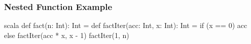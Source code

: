 \documentclass[dvipsnames]{beamer}
\theoremstyle{plain}
\begin{document}
\begin{frame}[fragile]
  \frametitle{Nested Function Example}

  \begin{example}
    \begin{pygments}{scala}
def fact(n: Int): Int = {
    def factIter(acc: Int, x: Int): Int =
        if (x == 0) acc
        else factIter(acc * x, x - 1)
    factIter(1, n)
}
    \end{pygments}
  \end{example}
\end{frame}
% 
% 
% 
% 
% 
% 
% 
\end{document}
